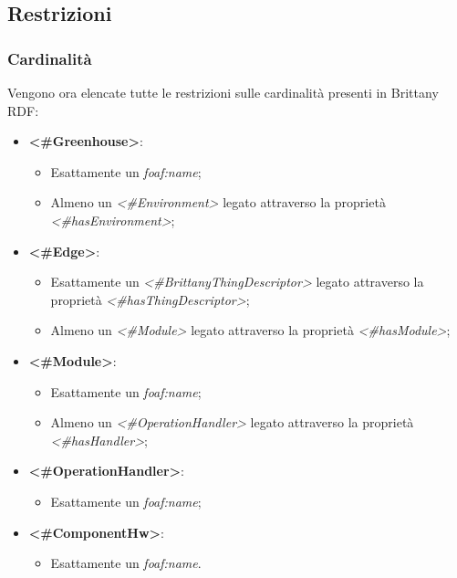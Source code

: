 \subsection{Restrizioni}
\subsubsection{Cardinalità}
Vengono ora elencate tutte le restrizioni sulle cardinalità presenti in Brittany RDF:
\begin{itemize}
	\item \textbf{<\#Greenhouse>}:
	\begin{itemize}
		\item Esattamente un \textit{foaf:name};
		\item Almeno un \textit{<\#Environment>} legato attraverso la proprietà \textit{<\#hasEnvironment>};
	\end{itemize}
	\item \textbf{<\#Edge>}:
	\begin{itemize}
		\item Esattamente un \textit{<\#BrittanyThingDescriptor>} legato attraverso la proprietà \textit{<\#hasThingDescriptor>};
		\item Almeno un \textit{<\#Module>} legato attraverso la proprietà \textit{<\#hasModule>};
	\end{itemize}
	\item \textbf{<\#Module>}:
	\begin{itemize}
		\item Esattamente un \textit{foaf:name};
		\item Almeno un \textit{<\#OperationHandler>} legato attraverso la proprietà \textit{<\#hasHandler>};
	\end{itemize}
	\item \textbf{<\#OperationHandler>}:
	\begin{itemize}
		\item Esattamente un \textit{foaf:name};
	\end{itemize}
	\item \textbf{<\#ComponentHw>}:
	\begin{itemize}
		\item Esattamente un \textit{foaf:name}.
	\end{itemize}
\end{itemize}
